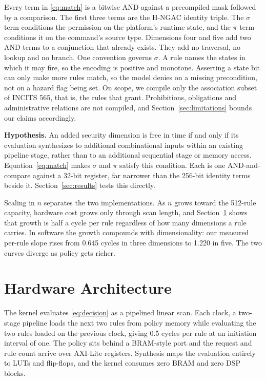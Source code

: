 \documentclass[conference]{IEEEtran}
\newcommand{\new}[1]{#1}
\begin{document}
Every term in \eqref{eq:match}
is a bitwise AND against a precompiled mask followed by a comparison. The first three terms are the H-NGAC identity triple. The $\sigma$ term conditions the permission on the platform's runtime state, and the $\pi$ term conditions it on the command's source type. Dimensions four and five add two AND terms to a conjunction that already exists. They add no traversal, no lookup and no branch. \new{One convention governs $\sigma$. A rule names the states in which it may fire, so the encoding is positive and monotone. Asserting a state bit can only make more rules match, so the model denies on a missing precondition, not on a hazard flag being set.} On scope, we compile only the association subset of INCITS 565, that is, the rules that grant. Prohibitions, obligations and administrative relations are not compiled, and Section~\ref{sec:limitations} bounds our claims accordingly.

\textbf{Hypothesis.} An added security dimension is free in time if and only if its evaluation synthesizes to additional combinational inputs within an existing pipeline stage, rather than to an additional sequential stage or memory access. Equation~\eqref{eq:match}
makes $\sigma$ and $\pi$ satisfy this condition. Each is one AND-and-compare against a 32-bit register, far narrower than the 256-bit identity terms beside it. Section~\ref{sec:results} tests this directly.

Scaling in $n$ separates the two implementations. As $n$ grows toward the 512-rule capacity, hardware cost grows only through scan length, and Section~\ref{sec:arch} shows that growth is half a cycle per rule regardless of how many dimensions a rule carries. In software the growth compounds with dimensionality: our measured per-rule slope rises from 0.645 cycles in three dimensions to 1.220 in five. The two curves diverge as policy gets richer.

\section{Hardware Architecture}
\label{sec:arch}

The kernel evaluates \eqref{eq:decision} as a pipelined linear scan. Each clock, a two-stage pipeline loads the next two rules from policy memory while evaluating the two rules loaded on the previous clock, giving 0.5 cycles per rule at an initiation interval of one. The policy sits behind a BRAM-style port and the request and rule count arrive over AXI-Lite registers. Synthesis maps the evaluation entirely to LUTs and flip-flops, and the kernel consumes zero BRAM and zero DSP blocks.
\end{document}
